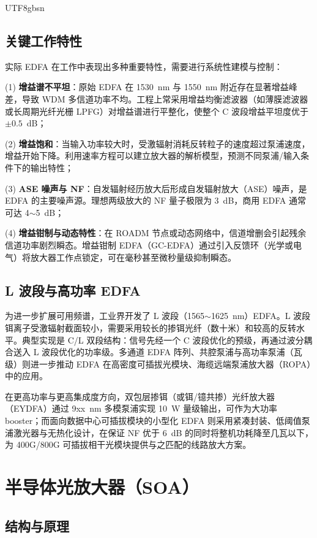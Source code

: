 \documentclass[11pt,a4paper]{article}
\begin{document}
\begin{CJK}{UTF8}{gbsn}
\subsection{关键工作特性}

实际 EDFA 在工作中表现出多种重要特性，需要进行系统性建模与控制\cite{sun1997}：

(1) \textbf{增益谱不平坦}：原始 EDFA 在 1530~nm 与 1550~nm 附近存在显著增益峰差，导致 WDM 多信道功率不均。工程上常采用增益均衡滤波器（如薄膜滤波器或长周期光纤光栅 LPFG）对增益谱进行平整化，使整个 C 波段增益平坦度优于 $\pm 0.5$~dB；

(2) \textbf{增益饱和}：当输入功率较大时，受激辐射消耗反转粒子的速度超过泵浦速度，增益开始下降。利用速率方程可以建立放大器的解析模型，预测不同泵浦/输入条件下的输出特性\cite{sun1997}；

(3) \textbf{ASE 噪声与 NF}：自发辐射经历放大后形成自发辐射放大（ASE）噪声，是 EDFA 的主要噪声源。理想两级放大的 NF 量子极限为 3~dB，商用 EDFA 通常可达 4$\sim$5~dB；

(4) \textbf{增益钳制与动态特性}：在 ROADM 节点或动态网络中，信道增删会引起残余信道功率剧烈瞬态。增益钳制 EDFA（GC-EDFA）通过引入反馈环（光学或电气）将放大器工作点锁定，可在毫秒甚至微秒量级抑制瞬态。

\subsection{L 波段与高功率 EDFA}

为进一步扩展可用频谱，工业界开发了 L 波段（1565$\sim$1625~nm）EDFA。L 波段铒离子受激辐射截面较小，需要采用较长的掺铒光纤（数十米）和较高的反转水平。典型实现是 C/L 双段结构：信号先经一个 C 波段优化的预级，再通过波分耦合送入 L 波段优化的功率级。多通道 EDFA 阵列、共腔泵浦与高功率泵浦（瓦级）则进一步推动 EDFA 在高密度可插拔光模块、海缆远端泵浦放大器（ROPA）中的应用\cite{becker1999}。

在更高功率与更高集成度方向，双包层掺铒（或铒/镱共掺）光纤放大器（EYDFA）通过 9xx~nm 多模泵浦实现 10~W 量级输出，可作为大功率 booster；而面向数据中心可插拔模块的小型化 EDFA 则采用紧凑封装、低阈值泵浦激光器与无热化设计，在保证 NF 优于 6~dB 的同时将整机功耗降至几瓦以下，为 400G/800G 可插拔相干光模块提供与之匹配的线路放大方案。

\section{半导体光放大器（SOA）}

\subsection{结构与原理}


\end{CJK}
\end{document}
